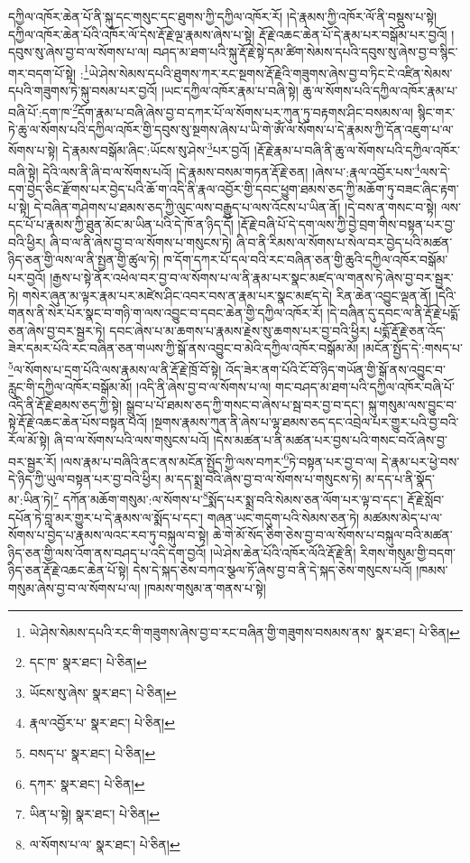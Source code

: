 དཀྱིལ་འཁོར་ཆེན་པོ་ནི་སྐུ་དང་གསུང་དང་ཐུགས་ཀྱི་དཀྱིལ་འཁོར་རོ། །དེ་རྣམས་ཀྱི་འཁོར་ལོ་ནི་བསྡུས་པ་སྟེ། དཀྱིལ་འཁོར་ཆེན་པོའི་འཁོར་ལོ་དེས་རྡོ་རྗེ་ལྔ་རྣམས་ཞེས་པ་སྟེ། རྡོ་རྗེ་འཆང་ཆེན་པོ་དེ་རྣམ་པར་བསྒོམ་པར་བྱའོ། །དབུས་སུ་ཞེས་བྱ་བ་ལ་སོགས་པ་ལ། བཤད་མ་ཐག་པའི་སྐུ་རྡོ་རྗེ་སྟེ་དམ་ཚིག་སེམས་དཔའི་དབུས་སུ་ཞེས་བྱ་བ་སྙིང་གར་བདག་པོ་སྟེ། :\footnote{ཡེ་ཤེས་སེམས་དཔའི་རང་གི་གཟུགས་ཞེས་བྱ་བ་རང་བཞིན་གྱི་གཟུགས་བསམས་ནས་  སྣར་ཐང་།  པེ་ཅིན། }ཡེ་ཤེས་སེམས་དཔའི་ཐུགས་ཀར་རང་སྔགས་རྡོ་རྗེའི་གཟུགས་ཞེས་བྱ་བ་ཏིང་ངེ་འཛིན་སེམས་དཔའི་གཟུགས་ཏེ་སྐུ་བསམ་པར་བྱའོ། །ཡང་དཀྱིལ་འཁོར་རྣམ་པ་བཞི་སྟེ། ཆུ་ལ་སོགས་པའི་དཀྱིལ་འཁོར་རྣམ་པ་བཞི་པོ་:དག་ཁ་\footnote{དང་ཁ་  སྣར་ཐང་།  པེ་ཅིན། }དོག་རྣམ་པ་བཞི་ཞེས་བྱ་བ་དཀར་པོ་ལ་སོགས་པར་ཀུན་ཏུ་བརྟགས་ཤིང་བསམས་ལ། སྙིང་གར་ཏེ་ཆུ་ལ་སོགས་པའི་དཀྱིལ་འཁོར་གྱི་དབུས་སུ་སྔགས་ཞེས་པ་ཡི་གེ་ཨོཾ་ལ་སོགས་པ་དེ་རྣམས་ཀྱི་དོན་འཇུག་པ་ལ་སོགས་པ་སྟེ། དེ་རྣམས་བསྒོམ་ཞིང་:ཡོངས་སུ་ཤེས་\footnote{ཡོངས་སུ་ཞེས་  སྣར་ཐང་།  པེ་ཅིན། }པར་བྱའོ། །རྡོ་རྗེ་རྣམ་པ་བཞི་ནི་ཆུ་ལ་སོགས་པའི་དཀྱིལ་འཁོར་བཞི་སྟེ། དེའི་ལས་ནི་ཞི་བ་ལ་སོགས་པའོ། །དེ་རྣམས་བསམ་གཏན་རྡོ་རྗེ་ཅན། །ཞེས་པ་:རྣལ་འབྱོར་པས་\footnote{རྣལ་འབྱོར་པ་  སྣར་ཐང་།  པེ་ཅིན། }ལས་དེ་དག་བྱེད་ཅིང་རྫོགས་པར་བྱེད་པའི་ཆོ་ག་འདི་ནི་རྣལ་འབྱོར་གྱི་དབང་ཕྱུག་ཐམས་ཅད་ཀྱི་མཆོག་ཏུ་བཟང་ཞིང་རྟག་པ་སྟེ། དེ་བཞིན་གཤེགས་པ་ཐམས་ཅད་ཀྱི་ལུང་ལས་བརྒྱུད་པ་ལས་འོངས་པ་ཡིན་ནོ། །དེ་བས་ན་གསང་བ་སྟེ། ལས་དང་པོ་པ་རྣམས་ཀྱི་ཐུན་མོང་མ་ཡིན་པའི་དེ་ཁོ་ན་ཉིད་དོ། །རྡོ་རྗེ་བཞི་པོ་དེ་དག་ལས་ཀྱི་བྱེ་བྲག་གིས་བསྟན་པར་བྱ་བའི་ཕྱིར། ཞི་བ་ལ་ནི་ཞེས་བྱ་བ་ལ་སོགས་པ་གསུངས་ཏེ། ཞི་བ་ནི་རིམས་ལ་སོགས་པ་སེལ་བར་བྱེད་པའི་མཚན་ཉིད་ཅན་གྱི་ལས་ལ་ནི་སྤྱན་གྱི་ཚུལ་ཏེ། ཁ་དོག་དཀར་པོ་དལ་བའི་རང་བཞིན་ཅན་གྱི་ཆུའི་དཀྱིལ་འཁོར་བསྒོམ་པར་བྱའོ། །རྒྱས་པ་སྟེ་ནོར་འཕེལ་བར་བྱ་བ་ལ་སོགས་པ་ལ་ནི་རྣམ་པར་སྣང་མཛད་ལ་གནས་ཏེ་ཞེས་བྱ་བར་སྦྱར་ཏེ། གསེར་ཞུན་མ་ལྟར་རྣམ་པར་མཛེས་ཤིང་འབར་བས་ན་རྣམ་པར་སྣང་མཛད་དེ། རིན་ཆེན་འབྱུང་ལྡན་ནོ། །དེའི་གནས་ནི་སེར་པོར་སྣང་བ་གཉི་ག་ལས་འབྱུང་བ་དབང་ཆེན་གྱི་དཀྱིལ་འཁོར་རོ། །དེ་བཞིན་དུ་དབང་ལ་ནི་རྡོ་རྗེ་པདྨོ་ཅན་ཞེས་བྱ་བར་སྦྱར་ཏེ། དབང་ཞེས་པ་མ་ཆགས་པ་རྣམས་རྗེས་སུ་ཆགས་པར་བྱ་བའི་ཕྱིར། པདྨོ་རྡོ་རྗེ་ཅན་འོད་ཟེར་དམར་པོའི་རང་བཞིན་ཅན་གཡས་ཀྱི་སྒོ་ནས་འབྱུང་བ་མེའི་དཀྱིལ་འཁོར་བསྒོམ་མོ། །མངོན་སྤྱོད་དེ་:གསད་པ་\footnote{བསད་པ་  སྣར་ཐང་།  པེ་ཅིན། }ལ་སོགས་པ་དྲག་པོའི་ལས་རྣམས་ལ་ནི་རྡོ་རྗེ་ཁྲོ་བོ་སྟེ། འོད་ཟེར་ནག་པོའི་ངོ་བོ་ཉིད་གཡོན་གྱི་སྒོ་ནས་འབྱུང་བ་རླུང་གི་དཀྱིལ་འཁོར་བསྒོམ་མོ། །འདི་ནི་ཞེས་བྱ་བ་ལ་སོགས་པ་ལ། གང་བཤད་མ་ཐག་པའི་དཀྱིལ་འཁོར་བཞི་པོ་འདི་ནི་རྡོ་རྗེ་ཐམས་ཅད་ཀྱི་སྟེ། སྒྲུབ་པ་པོ་ཐམས་ཅད་ཀྱི་གསང་བ་ཞེས་པ་སྦ་བར་བྱ་བ་དང་། སྐུ་གསུམ་ལས་བྱུང་བ་སྟེ་རྡོ་རྗེ་འཆང་ཆེན་པོས་བསྟན་པའོ། །སྔགས་རྣམས་ཀུན་ནི་ཞེས་པ་ལྷ་ཐམས་ཅད་དང་འབྲེལ་པར་གྱུར་པའི་བྱ་བའི་རོལ་མོ་སྟེ། ཞི་བ་ལ་སོགས་པའི་ལས་གསུངས་པའོ། །དེས་མཚན་པ་ནི་མཚན་པར་བྱས་པའི་གསང་བའོ་ཞེས་བྱ་བར་སྦྱར་རོ། །ལས་རྣམ་པ་བཞིའི་ནང་ནས་མངོན་སྤྱོད་ཀྱི་ལས་བཀར་\footnote{དཀར་  སྣར་ཐང་།  པེ་ཅིན། }ཏེ་བསྟན་པར་བྱ་བ་ལ། དེ་རྣམ་པར་ཕྱེ་བས་དེ་ཉིད་ཀྱི་ཡུལ་བསྟན་པར་བྱ་བའི་ཕྱིར། མ་དད་སྨྲ་བའི་ཞེས་བྱ་བ་ལ་སོགས་པ་གསུངས་ཏེ། མ་དད་པ་ནི་སྣོད་མ་:ཡིན་ཏེ།\footnote{ཡིན་པ་སྟེ།  སྣར་ཐང་།  པེ་ཅིན། } དཀོན་མཆོག་གསུམ་:ལ་སོགས་པ་\footnote{ལ་སོགས་པ་ལ་  སྣར་ཐང་།  པེ་ཅིན། }སྨོད་པར་སྨྲ་བའི་སེམས་ཅན་ལོག་པར་ལྟ་བ་དང་། རྡོ་རྗེ་སློབ་དཔོན་ཏེ་བླ་མར་གྱུར་པ་དེ་རྣམས་ལ་སྨོད་པ་དང་། གཞན་ཡང་གདུག་པའི་སེམས་ཅན་ཏེ། མཚམས་མེད་པ་ལ་སོགས་པ་བྱེད་པ་རྣམས་ལའང་རབ་ཏུ་བསྐུལ་བ་སྟེ། ཆེ་གེ་མོ་སོད་ཅིག་ཅེས་བྱ་བ་ལ་སོགས་པ་བསྐུལ་བའི་མཚན་ཉིད་ཅན་གྱི་ལས་འོག་ནས་བཤད་པ་འདི་དག་བྱའོ། །ཡེ་ཤེས་ཆེན་པོའི་འཁོར་ལོའི་རྡོ་རྗེ་ནི། རིགས་གསུམ་གྱི་བདག་ཉིད་ཅན་རྡོ་རྗེ་འཆང་ཆེན་པོ་སྟེ། དེས་དེ་སྐད་ཅེས་བཀའ་སྩལ་ཏོ་ཞེས་བྱ་བ་ནི་དེ་སྐད་ཅེས་གསུངས་པའོ། །ཁམས་གསུམ་ཞེས་བྱ་བ་ལ་སོགས་པ་ལ། །ཁམས་གསུམ་ན་གནས་པ་སྟེ། 